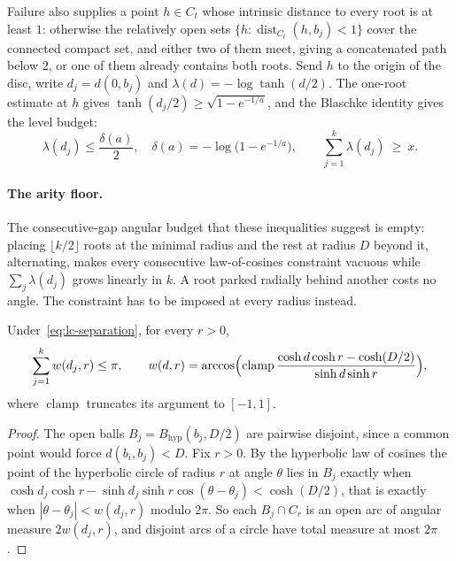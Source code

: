 \documentclass[11pt]{article}
\begin{document}
Failure also supplies a point $h\in C_t$ whose intrinsic distance to every
root is at least $1$: otherwise the relatively open sets
$\{h:\operatorname{dist}_{C_t}(h,b_j)<1\}$ cover the connected compact set,
and either two of them meet, giving a concatenated path below $2$, or one of
them already contains both roots.  Send $h$ to the origin of the disc, write
$d_j=d(0,b_j)$ and $\lambda(d)=-\log\tanh(d/2)$.  The one-root estimate at $h$
gives $\tanh(d_j/2)\ge\sqrt{1-e^{-1/a}}$, and the Blaschke identity gives the
level budget:
\begin{equation}\label{eq:lc-radius-and-budget}
 \lambda(d_j)\le\frac{\delta(a)}2,\quad
 \delta(a)=-\log\bigl(1-e^{-1/a}\bigr),
 \qquad
 \sum_{j=1}^{k}\lambda(d_j)\ \ge\ x .
\end{equation}

\paragraph{The arity floor.}
The consecutive-gap angular budget that these inequalities suggest is empty:
placing $\lfloor k/2\rfloor$ roots at the minimal radius and the rest at
radius $D$ beyond it, alternating, makes every consecutive law-of-cosines
constraint vacuous while $\sum_j\lambda(d_j)$ grows linearly in $k$.  A root
parked radially behind another costs no angle.  The constraint has to be
imposed at every radius instead.

\begin{lemma}\label{res:circle-slice-packing}
Under~\eqref{eq:lc-separation}, for every $r>0$,
\[
 \sum_{j=1}^{k}w(d_j,r)\le\pi,\qquad
 w(d,r)=\arccos\Bigl(\operatorname{clamp}
   \frac{\cosh d\cosh r-\cosh(D/2)}{\sinh d\sinh r}\Bigr),
\]
where $\operatorname{clamp}$ truncates its argument to $[-1,1]$.
\end{lemma}

\begin{proof}
The open balls $B_j=B_{\mathrm{hyp}}(b_j,D/2)$ are pairwise disjoint, since a
common point would force $d(b_i,b_j)<D$.  Fix $r>0$.  By the hyperbolic law of
cosines the point of the hyperbolic circle of radius $r$ at angle $\theta$
lies in $B_j$ exactly when
$\cosh d_j\cosh r-\sinh d_j\sinh r\cos(\theta-\theta_j)<\cosh(D/2)$, that is
exactly when $|\theta-\theta_j|<w(d_j,r)$ modulo $2\pi$.  So each
$B_j\cap C_r$ is an open arc of angular measure $2w(d_j,r)$, and disjoint arcs
of a circle have total measure at most $2\pi$.
\end{proof}
\end{document}
